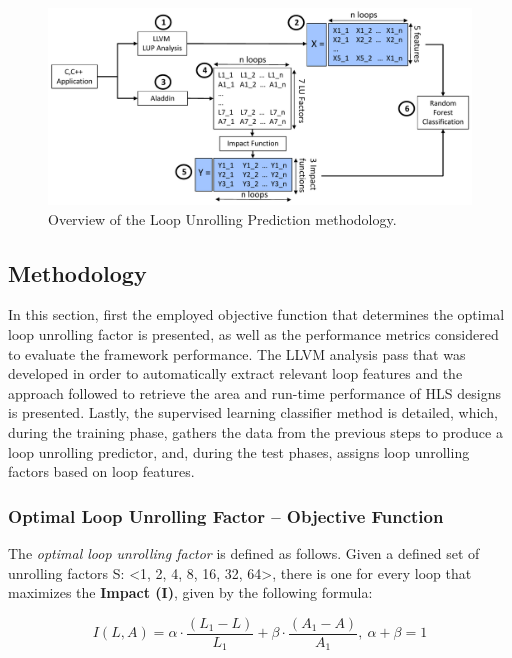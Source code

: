 \documentclass[]{usiinfthesis}
\begin{document}
\begin{figure}[h!]
\centering
\includegraphics[width= 1 \linewidth]{figs/LUP_method}
\caption{Overview of the Loop Unrolling Prediction methodology.}
\label{fig:lup_method}
\end{figure}

\subsection{Methodology}
\label{sec:ml_meth}



In this section, first the employed objective function that determines the optimal loop 
unrolling factor is presented, as well as the performance metrics considered to evaluate 
the framework performance. The LLVM analysis pass that was developed in order to 
automatically extract relevant loop features and the approach followed to retrieve the 
area and run-time performance of HLS designs is presented. Lastly, the supervised learning 
classifier method is detailed, which, during the training phase, gathers the data from the 
previous steps to produce a loop unrolling predictor, and, during the test phases, assigns 
loop unrolling factors based on loop features.\par

\subsubsection{Optimal Loop Unrolling Factor -- Objective Function}

The {\em optimal loop unrolling factor} is defined as follows.
Given a defined set of unrolling factors S: <1, 2, 4, 8, 16, 32, 64>, there is one for every
loop that maximizes the \textbf {Impact (I)}, given by the following formula:

$$I(L,A)= \alpha  \cdot \dfrac{ (L_1 - L)} {L_1} + \beta \cdot \dfrac{ (A_1 - A)} {A_1},\ \alpha + \beta = 1$$
\end{document}
